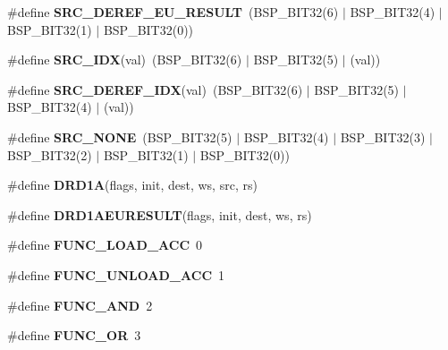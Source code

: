 \begin{DoxyCompactItemize}
\#define {\bfseries S\+R\+C\+\_\+\+D\+E\+R\+E\+F\+\_\+\+E\+U\+\_\+\+R\+E\+S\+U\+LT}~(B\+S\+P\+\_\+\+B\+I\+T32(6) $\vert$ B\+S\+P\+\_\+\+B\+I\+T32(4) $\vert$ B\+S\+P\+\_\+\+B\+I\+T32(1) $\vert$ B\+S\+P\+\_\+\+B\+I\+T32(0))
\item 
\mbox{\label{group__BestCommOps_ga32a11ff604d6b2f832c8ae96db234e27}} 
\#define {\bfseries S\+R\+C\+\_\+\+I\+DX}(val)~(B\+S\+P\+\_\+\+B\+I\+T32(6) $\vert$ B\+S\+P\+\_\+\+B\+I\+T32(5) $\vert$ (val))
\item 
\mbox{\label{group__BestCommOps_gabb9b51d4c52862259e99356d8e7f4338}} 
\#define {\bfseries S\+R\+C\+\_\+\+D\+E\+R\+E\+F\+\_\+\+I\+DX}(val)~(B\+S\+P\+\_\+\+B\+I\+T32(6) $\vert$ B\+S\+P\+\_\+\+B\+I\+T32(5) $\vert$ B\+S\+P\+\_\+\+B\+I\+T32(4) $\vert$ (val))
\item 
\mbox{\label{group__BestCommOps_gaacf02158f8239456f6ae20f227b81461}} 
\#define {\bfseries S\+R\+C\+\_\+\+N\+O\+NE}~(B\+S\+P\+\_\+\+B\+I\+T32(5) $\vert$ B\+S\+P\+\_\+\+B\+I\+T32(4) $\vert$ B\+S\+P\+\_\+\+B\+I\+T32(3) $\vert$ B\+S\+P\+\_\+\+B\+I\+T32(2) $\vert$ B\+S\+P\+\_\+\+B\+I\+T32(1) $\vert$ B\+S\+P\+\_\+\+B\+I\+T32(0))
\item 
\#define {\bfseries D\+R\+D1A}(flags,  init,  dest,  ws,  src,  rs)
\item 
\#define {\bfseries D\+R\+D1\+A\+E\+U\+R\+E\+S\+U\+LT}(flags,  init,  dest,  ws,  rs)
\item 
\mbox{\label{group__BestCommOps_gaba2e411f971a4cac80a72655d8d857ee}} 
\#define {\bfseries F\+U\+N\+C\+\_\+\+L\+O\+A\+D\+\_\+\+A\+CC}~0
\item 
\mbox{\label{group__BestCommOps_ga9ea899adebae68b8dcb2c7fd4ac7333d}} 
\#define {\bfseries F\+U\+N\+C\+\_\+\+U\+N\+L\+O\+A\+D\+\_\+\+A\+CC}~1
\item 
\mbox{\label{group__BestCommOps_gae541d52834de9c925db0415c984e5754}} 
\#define {\bfseries F\+U\+N\+C\+\_\+\+A\+ND}~2
\item 
\mbox{\label{group__BestCommOps_ga9a16f227645eaebe54ffe90eb7c9bbc4}} 
\#define {\bfseries F\+U\+N\+C\+\_\+\+OR}~3
\item 
\mbox{\label{group__BestCommOps_gaa5326947930b6d2b5f19eb1855226cb8}} 

\end{DoxyCompactItemize}
